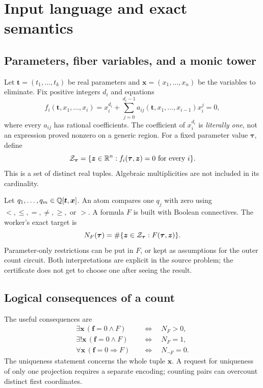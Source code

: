 \section{Input language and exact semantics}\label{sec:language}

\subsection{Parameters, fiber variables, and a monic tower}

Let $\bm t=(t_1,\ldots,t_k)$ be real parameters and $\bm x=(x_1,\ldots,x_n)$ be the variables to eliminate. Fix positive integers $d_i$ and equations
\begin{equation}\label{eq:triangular}
f_i(\bm t,x_1,\ldots,x_i)
=x_i^{d_i}+\sum_{j=0}^{d_i-1}a_{ij}(\bm t,x_1,\ldots,x_{i-1})x_i^j=0,
\end{equation}
where every $a_{ij}$ has rational coefficients. The coefficient of $x_i^{d_i}$ is \emph{literally one}, not an expression proved nonzero on a generic region. For a fixed parameter value $\bm\tau$, define
\[
\mathcal Z_{\bm\tau}=\{\bm z\in\mathbb R^n:f_i(\bm\tau,\bm z)=0\text{ for every }i\}.
\]
This is a set of distinct real tuples. Algebraic multiplicities are not included in its cardinality.

Let $q_1,\ldots,q_m\in\mathbb Q[\bm t,\bm x]$. An atom compares one $q_j$ with zero using $<,\leq,=,\ne,\geq,$ or $>$. A formula $F$ is built with Boolean connectives. The worker's exact target is
\begin{equation}\label{eq:countdef}
N_F(\bm\tau)=\#\{\bm z\in\mathcal Z_{\bm\tau}:F(\bm\tau,\bm z)\}.
\end{equation}
Parameter-only restrictions can be put in $F$, or kept as assumptions for the outer count circuit. Both interpretations are explicit in the source problem; the certificate does not get to choose one after seeing the result.

\subsection{Logical consequences of a count}

The useful consequences are
\begin{align}
\exists\bm x\,(\bm f=0\wedge F)&\quad\Longleftrightarrow\quad N_F>0,\label{eq:exists}\\
\exists!\bm x\,(\bm f=0\wedge F)&\quad\Longleftrightarrow\quad N_F=1,\label{eq:unique}\\
\forall\bm x\,(\bm f=0\Longrightarrow F)&\quad\Longleftrightarrow\quad N_{\neg F}=0.\label{eq:forall}
\end{align}
The uniqueness statement concerns the whole tuple $\bm x$. A request for uniqueness of only one projection requires a separate encoding; counting pairs can overcount distinct first coordinates.

